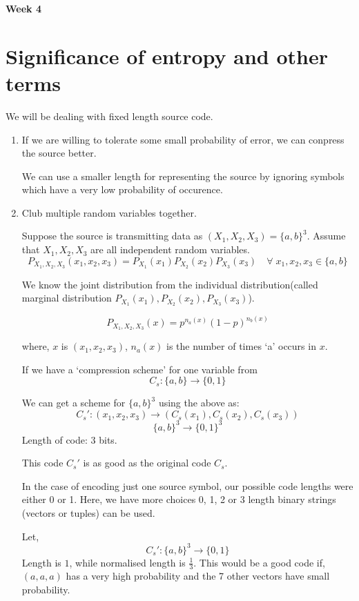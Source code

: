 \documentclass{article}
\begin{document}
\begin{center}
\textbf{\huge{Week 4}}
\end{center}

\section{Significance of entropy and other terms}

We will be dealing with fixed length source code.

\begin{enumerate}
    \item If we are willing to tolerate some small probability of error, we can conpress the source better.

    We can use a smaller length for representing the source by ignoring symbols which have a very low probability of occurence.

    \item Club multiple random variables together.

    Suppose the source is transmitting data as $(X_1,X_2,X_3)= \{ a,b\}^3$. Assume that $X_1,X_2,X_3$ are all independent random variables.
    $$ P_{X_1,X_2,X_3}(x_1,x_2,x_3)=P_{X_1}(x_1)P_{X_2}(x_2)P_{X_3}(x_3) \quad \forall \; x_1,x_2,x_3 \in \{a,b\}$$

    We know the joint distribution from the individual distribution(called marginal distribution $P_{X_1}(x_1),P_{X_2}(x_2),P_{X_3}(x_3)$).

    $$ P_{X_1,X_2,X_3}(x)= p^{n_a (x)}(1-p)^{n_b (x)}$$

    where, $x$ is $(x_1,x_2,x_3)$, $n_a(x)$ is the number of times `a' occurs in $x$.

    If we have a `compression scheme' for one variable from
    $$ C_s :\{a,b \} \to \{ 0,1 \}$$

    We can get a scheme for $\{a,b\}^3$ using the above as:
    $$ C_{s}':(x_1,x_2,x_3) \to (C_s(x_1),C_s(x_2),C_s(x_3))$$
    $$\{ a,b\}^3 \to \{ 0,1\}^3$$
    Length of code: 3 bits.

    This code $C_{s}'$ is as good as the original code $C_s$.

    In the case of encoding just one source symbol, our possible code lengths were either 0 or 1. Here, we have more choices 0, 1, 2 or 3 length binary strings (vectors or tuples) can be used.

    Let,
    $$C_{s}':\{ a,b\}^3 \to \{ 0,1\} $$
    Length is $1$, while normalised length is $\frac{1}{3}$. This would be a good code if, $(a,a,a)$ has a very high probability and the 7 other vectors have small probability.


\end{enumerate}
\end{document}
